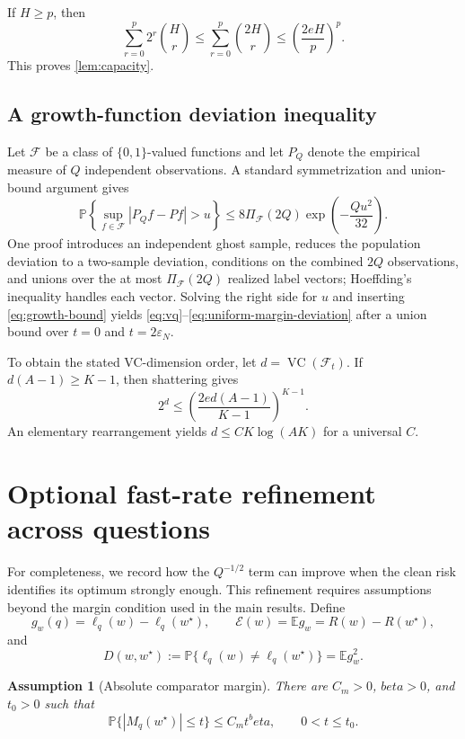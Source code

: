 \documentclass[11pt]{article}
\def\beta{beta}%
\newtheorem{assumption}[theorem]{Assumption}
\newcommand{\Pp}{\mathbb P}
\newcommand{\E}{\mathbb E}
\newcommand{\calF}{\mathcal F}
\newcommand{\eps}{\varepsilon}
\newcommand{\abs}[1]{\left|#1\right|}
\begin{document}
If $H\ge p$, then
\[
\sum_{r=0}^{p}2^r\binom Hr
\le
\sum_{r=0}^{p}\binom{2H}{r}
\le
\left(\frac{2eH}{p}\right)^p.
\]
This proves \cref{lem:capacity}.

\subsection{A growth-function deviation inequality}

Let $\calF$ be a class of $\{0,1\}$-valued functions and let $P_Q$ denote the empirical measure of $Q$ independent observations.  A standard symmetrization and union-bound argument gives
\begin{equation}
\label{eq:vc-ineq}
\Pp\left
\{
\sup_{f\in\calF}|P_Qf-Pf|>u
\right\}
\le
8\Pi_{\calF}(2Q)\exp\left(-\frac{Qu^2}{32}\right).
\end{equation}
One proof introduces an independent ghost sample, reduces the population deviation to a two-sample deviation, conditions on the combined $2Q$ observations, and unions over the at most $\Pi_{\calF}(2Q)$ realized label vectors; Hoeffding's inequality handles each vector.  Solving the right side for $u$ and inserting \eqref{eq:growth-bound} yields \eqref{eq:vq}--\eqref{eq:uniform-margin-deviation} after a union bound over $t=0$ and $t=2\eps_N$.

To obtain the stated VC-dimension order, let $d=\operatorname{VC}(\calF_t)$.  If $d(A-1)\ge K-1$, then shattering gives
\[
2^d
\le
\left(\frac{2ed(A-1)}{K-1}\right)^{K-1}.
\]
An elementary rearrangement yields $d\le C K\log(AK)$ for a universal $C$.

\section{Optional fast-rate refinement across questions}
\label{app:fastQ}

For completeness, we record how the $Q^{-1/2}$ term can improve when the clean risk identifies its optimum strongly enough.  This refinement requires assumptions beyond the margin condition used in the main results.  Define
\[
g_w(q)=\ell_q(w)-\ell_q(w^\star),
\qquad
\mathcal E(w)=\E g_w=R(w)-R(w^\star),
\]
and
\begin{equation}
\label{eq:disagreement}
D(w,w^\star)
:=
\Pp\{\ell_q(w)\ne\ell_q(w^\star)\}
=\E g_w^2.
\end{equation}

\begin{assumption}[Absolute comparator margin]
\label{ass:absolute-margin}
There are $C_m>0$, $\beta>0$, and $t_0>0$ such that
\[
\Pp\{\abs{M_q(w^\star)}\le t\}
\le C_m t^\beta,
\qquad 0<t\le t_0.
\]
\end{assumption}
\end{document}
